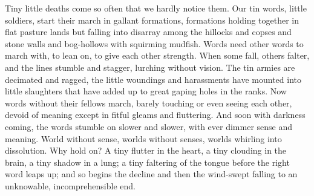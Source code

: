 Tiny little deaths come so often that we hardly notice them. Our tin
words, little soldiers, start their march in gallant formations,
formations holding together in flat pasture lands but falling into
disarray among the hillocks and copses and stone walls and bog-hollows
with squirming mudfish. Words need other words to march with, to lean
on, to give each other strength. When some fall, others falter, and the
lines stumble and stagger, lurching without vision. The tin armies are
decimated and ragged, the little woundings and harassments have mounted
into little slaughters that have added up to great gaping holes in the
ranks. Now words without their fellows march, barely touching or even
seeing each other, devoid of meaning except in fitful gleams and
fluttering. And soon with darkness coming, the words stumble on slower
and slower, with ever dimmer sense and meaning. World without sense,
worlds without senses, worlds whirling into dissolution. Why hold on? A
tiny flutter in the heart, a tiny clouding in the brain, a tiny shadow
in a lung; a tiny faltering of the tongue before the right word leaps
up; and so begins the decline and then the wind-swept falling to an
unknowable, incomprehensible end.
